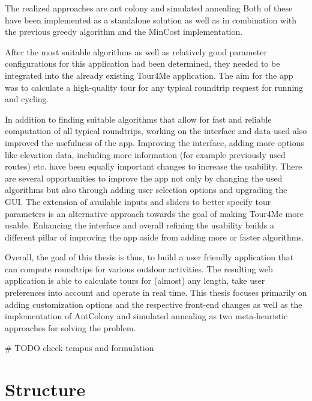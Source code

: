 The realized approaches are ant colony \cite{babaoglu_anthill_2002, dorigo_ant_1996, gendreau_handbook_2010, wang_application_2014} and simulated annealing \cite{aarts_simulated_2005, delahaye_simulated_2019, eglese_simulated_1990, zhan_list-based_2016}
Both of these have been implemented as a standalone solution as well as in combination with the previous greedy algorithm and the MinCost implementation.

After the most suitable algorithms as well as relatively good parameter configurations  for this application had been determined, they needed to be integrated into the already existing Tour4Me application. The aim for the app was to calculate a high-quality tour for any typical roundtrip request for running and cycling.

In addition to finding suitable algorithms that allow for fast and reliable computation of all typical roundtrips, working on the interface and data used also improved the usefulness of the app.
Improving the interface, adding more options like elevation data, including more information (for example previously used routes) etc. have been equally important changes to increase the usability.
There are several opportunities to improve the app not only by changing the used algorithms but also through adding user selection options and upgrading the GUI.
The extension of available inputs and sliders to better specify tour parameters is an alternative approach towards the goal of making Tour4Me more usable.
Enhancing the interface and overall refining the usability builds a different pillar of improving the app aside from adding more or faster algorithms.

Overall, the goal of this thesis is thus, to build a user friendly application that can compute roundtrips for various outdoor activities.
The resulting web application is able to calculate tours for (almost) any length, take user preferences into account and operate in real time.
This thesis focuses primarily on adding customization options and the respective front-end changes as well as the implementation of AntColony and simulated annealing as two meta-heuristic approaches for solving the problem.


\# TODO check tempus and formulation







\section{Structure}
\label{sec:structure}


